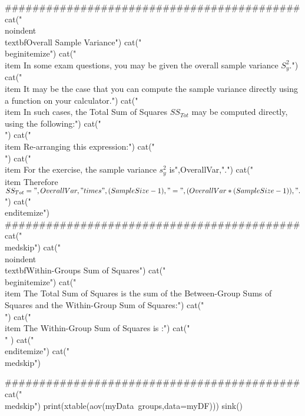 ###########################################
cat("\n\\noindent \\textbf{Overall Sample Variance}") 
cat("\n\\begin{itemize}")
cat("\n\\item In some exam questions, you may be given the overall sample variance $S^2_{y}$.")
cat("\n\\item It may be the case that you can compute the sample variance directly using a function on your calculator.")
cat("\n\\item In such cases, the Total Sum of Squares $SS_{Tot}$ may be computed directly, using the following:")
cat("\n \\[ \\operatorname{Var}(y) = s^2_{y} = \\frac{SS_{Tot}}{n-1} . \\]  ")
cat("\n\\item Re-arranging this expression:")
cat("\n \\[ SS_{Tot}  = s^2_{y} \\times (n-1) . \\]  ")
cat("\n \\item For the exercise, the sample variance $s^2_{y} $ is",OverallVar,".")
cat("\n \\item Therefore $SS_{Tot}  = ",  OverallVar, "\\times",  (SampleSize -1), " = " ,  (OverallVar *  (SampleSize -1)) ,".$")
cat("\n\\end{itemize}")
###########################################
cat("\n\\medskip")
cat("\n\n\\noindent \\textbf{Within-Groups Sum of Squares}") 
cat("\n\\begin{itemize}")
cat("\n\\item The Total Sum of Squares is the sum of the Between-Group Sums of Squares and the Within-Group Sum of Squares:")
cat("\n \\[ SS_{Tot}  = SS_{Between} + SS_{Within} . \\]  ")
cat("\n\\item The Within-Group Sum of Squares is :")
cat("\n \\[ SS_{Tot}  - SS_{Between} = ", SStotal  ,"-",  SSbetween, "=", (SStotal - SSbetween),"\\]" )
cat("\n\\end{itemize}")
cat("\n\\medskip")

###########################################
cat("\n\\medskip")
print(xtable(aov(myData~groups,data=myDF)))
sink()
